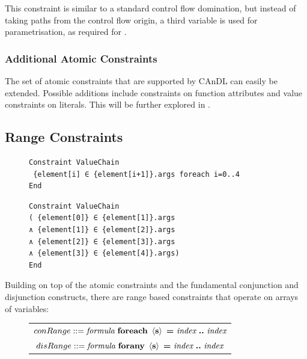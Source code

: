     \noindent
    This constraint is similar to a standard control flow domination, but
    instead of taking paths from the control flow origin, a third variable is
    used for parametrisation, as required for .

\subsubsection{Additional Atomic Constraints}

    The set of atomic constraints that are supported by CAnDL can easily be
    extended.
    Possible additions include constraints on function attributes and value
    constraints on literals.
    This will be further explored in .

\subsection{Range Constraints}

\begin{figure}[t]
\vspace{3.6mm}
\begin{lstlisting}[language=CAnDL]
Constraint ValueChain
 {element[i] ∈ {element[i+1]}.args foreach i=0..4
End
\end{lstlisting}
\begin{lstlisting}[language=CAnDL,label={fig:forall},caption=
   {Example for the expansion of range constraints in CAnDL:
    The specification at the top can be ``unrolled'' manually, resulting in the
    equivalent, but more verbose, specification below.}]
Constraint ValueChain
( {element[0]} ∈ {element[1]}.args
∧ {element[1]} ∈ {element[2]}.args
∧ {element[2]} ∈ {element[3]}.args
∧ {element[3]} ∈ {element[4]}.args)
End
\end{lstlisting}
\end{figure}

    Building on top of the atomic constraints and the fundamental conjunction
    and disjunction constructs, there are range based constraints that operate
    on arrays of variables:
\begin{figure}[h]
  \centering
  \begin{tabular}{|c|}
    \hline
    $conRange ::= \text{\it formula}\ \text{\bf foreach}\ \left<\text{\bf s}\right>\ \text{\bf =}\ \text{\it index}\ \text{\bf ..}\ \text{\it index}$\\
    $disRange ::= \text{\it formula}\ \text{\bf forany}\ \left<\text{\bf s}\right>\ \text{\bf =}\ \text{\it index}\ \text{\bf ..}\ \text{\it index}$\\
    \hline
  \end{tabular}
\end{figure}

